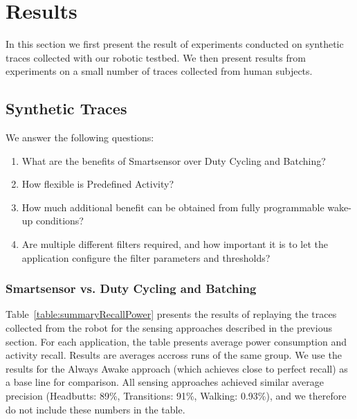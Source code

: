


\section{Results}
\label{sec:results}

In this section we first present the result of experiments conducted
on synthetic traces collected with our robotic testbed.  We then
present results from experiments on a small number of traces collected
from human subjects. 


\subsection{Synthetic Traces}

We answer the following questions:

\begin{enumerate}
\setlength{\itemsep}{-3pt}  

\item What are the benefits of Smartsensor over Duty Cycling and
  Batching?

\item How flexible is Predefined Activity?

\item How much additional benefit can be obtained from fully
  programmable wake-up conditions?

\item Are multiple different filters required, and how important it is
  to let the application configure the filter parameters and
  thresholds?

\end{enumerate}

\subsubsection{Smartsensor vs. Duty Cycling and Batching}

Table~\ref{table:summaryRecallPower} presents the results of replaying
the traces collected from the robot for the sensing approaches
described in the previous section.  For each application, the table
presents average power consumption and activity recall.  Results are
averages accross runs of the same group.  We use the results for the
Always Awake approach (which achieves close to perfect recall) as a
base line for comparison.  All sensing approaches achieved similar
average precision (Headbutts: 89\%, Transitions: 91\%, Walking:
0.93\%), and we therefore do not include these numbers in the table.

